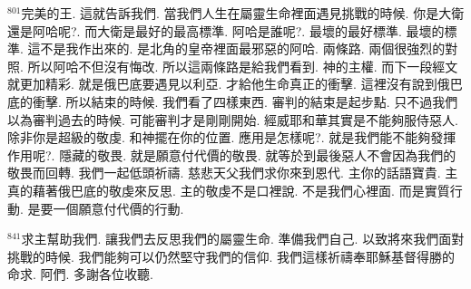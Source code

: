 \documentclass{book}
\begin{document}
$^{801}$完美的王.
這就告訴我們.
當我們人生在屬靈生命裡面遇見挑戰的時候.
你是大衛還是阿哈呢?.
而大衛是最好的最高標準.
阿哈是誰呢?.
最壞的最好標準.
最壞的標準.
這不是我作出來的.
是北角的皇帝裡面最邪惡的阿哈.
兩條路.
兩個很強烈的對照.
所以阿哈不但沒有悔改.
所以這兩條路是給我們看到.
神的主權.
而下一段經文就更加精彩.
就是俄巴底要遇見以利亞.
才給他生命真正的衝擊.
這裡沒有說到俄巴底的衝擊.
所以結束的時候.
我們看了四樣東西.
審判的結束是起步點.
只不過我們以為審判過去的時候.
可能審判才是剛剛開始.
經威耶和華其實是不能夠服侍惡人.
除非你是超級的敬虔.
和神擺在你的位置.
應用是怎樣呢?.
就是我們能不能夠發揮作用呢?.
隱藏的敬畏.
就是願意付代價的敬畏.
就等於到最後惡人不會因為我們的敬畏而回轉.
我們一起低頭祈禱.
慈悲天父我們求你來到恩代.
主你的話語寶貴.
主真的藉著俄巴底的敬虔來反思.
主的敬虔不是口裡說.
不是我們心裡面.
而是實質行動.
是要一個願意付代價的行動.

$^{841}$求主幫助我們.
讓我們去反思我們的屬靈生命.
準備我們自己.
以致將來我們面對挑戰的時候.
我們能夠可以仍然堅守我們的信仰.
我們這樣祈禱奉耶穌基督得勝的命求.
阿們.
多謝各位收聽.
\newpage
\end{document}
